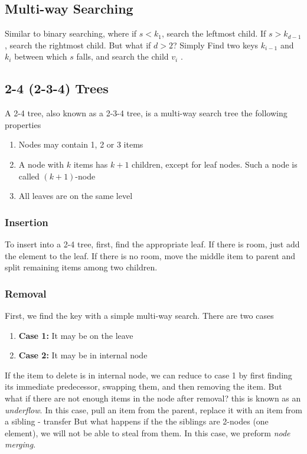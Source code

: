 \documentclass{report}
\begin{document}
\subsection{Multi-way Searching}
\bigbreak \noindent 
Similar to binary searching, where if $s < k_{1}$, search the leftmost child. If $s>k_{d-1}$ , search the rightmost child. But what if $d>2$? Simply Find two keys $k_{i-1}$ and $k_{i}$ between which $s$ falls, and search the child $v_{i}$ .

\pagebreak 
\subsection{2-4 (2-3-4) Trees}
\bigbreak \noindent 
A 2-4 tree, also known as a 2-3-4 tree, is a multi-way search tree the following properties
\begin{enumerate}
    \item Nodes may contain 1, 2 or 3 items
    \item A node with $k$ items has $k + 1$ children, except for leaf nodes. Such a node is called $(k+1)$-node
    \item All leaves are on the same level
\end{enumerate}
\bigbreak \noindent 
{}
\bigbreak \noindent 
\subsubsection{Insertion}
\bigbreak \noindent 
To insert into a 2-4 tree, first, find the appropriate leaf. If there is room, just add the element to the leaf. If there is no room, move the middle item to parent and split remaining items among two children.
\bigbreak \noindent 
{}
\bigbreak \noindent 
{}

\bigbreak \noindent 
\subsubsection{Removal}
\bigbreak \noindent 
First, we find the key with a simple multi-way search. There are two cases
\begin{enumerate}
    \item \textbf{Case 1:} It may be on the leave
    \item \textbf{Case 2:} It may be in internal node
\end{enumerate}
\bigbreak \noindent 
If the item to delete is in internal node, we can reduce to case 1 by first finding its immediate predecessor, swapping them, and then removing the item.
\bigbreak \noindent 
{}
\bigbreak \noindent 
But what if there are not enough items in the node after removal? this is known as an \textit{underflow}. In this case, pull an item from the parent, replace it with an item from a sibling - transfer 
\bigbreak \noindent 
{}
\bigbreak \noindent 
But what happens if the the siblings are 2-nodes (one element), we will not be able to steal from them. In this case, we preform \textit{node merging}.
\bigbreak \noindent 
{}
\bigbreak \noindent 
{}
\end{document}
